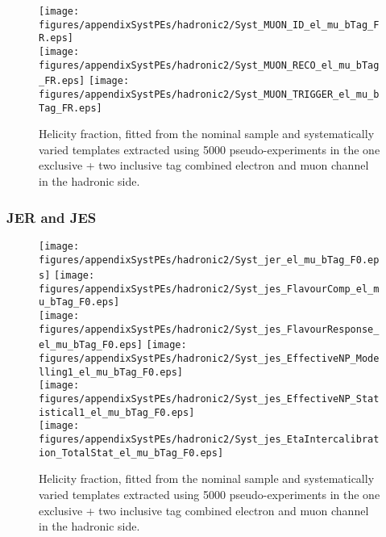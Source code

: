 \begin{figure}[!hb]
\begin{center}
        \texttt{[image: figures/appendixSystPEs/hadronic2/Syst\_MUON\_ID\_el\_mu\_bTag\_FR.eps]}\\
        \texttt{[image: figures/appendixSystPEs/hadronic2/Syst\_MUON\_RECO\_el\_mu\_bTag\_FR.eps]}
        \texttt{[image: figures/appendixSystPEs/hadronic2/Syst\_MUON\_TRIGGER\_el\_mu\_bTag\_FR.eps]}        
\caption{Helicity fraction, \fr fitted from the nominal \ttbar sample and systematically varied templates extracted using 5000 pseudo-experiments in the one exclusive + two inclusive \bt tag combined electron and muon channel in the hadronic side. }
\label{fig:systematicVar_lep_fR_elmu2incl_MUON}
\end{center}
\end{figure}

\clearpage
\subsubsection{JER and JES}
\begin{figure}[!hb]
\begin{center}
        \texttt{[image: figures/appendixSystPEs/hadronic2/Syst\_jer\_el\_mu\_bTag\_F0.eps]}
        \texttt{[image: figures/appendixSystPEs/hadronic2/Syst\_jes\_FlavourComp\_el\_mu\_bTag\_F0.eps]}\\
        \texttt{[image: figures/appendixSystPEs/hadronic2/Syst\_jes\_FlavourResponse\_el\_mu\_bTag\_F0.eps]}
        \texttt{[image: figures/appendixSystPEs/hadronic2/Syst\_jes\_EffectiveNP\_Modelling1\_el\_mu\_bTag\_F0.eps]}\\
        \texttt{[image: figures/appendixSystPEs/hadronic2/Syst\_jes\_EffectiveNP\_Statistical1\_el\_mu\_bTag\_F0.eps]}\\
        \texttt{[image: figures/appendixSystPEs/hadronic2/Syst\_jes\_EtaIntercalibration\_TotalStat\_el\_mu\_bTag\_F0.eps]}
\caption{Helicity fraction, \fo fitted from the nominal \ttbar sample and systematically varied templates extracted using 5000 pseudo-experiments in the one exclusive + two inclusive \bt tag combined electron and muon channel in the hadronic side. }
\label{fig:systematicVar_lep_f0_elmu2incl_JERJES_1}
\end{center}
\end{figure}


